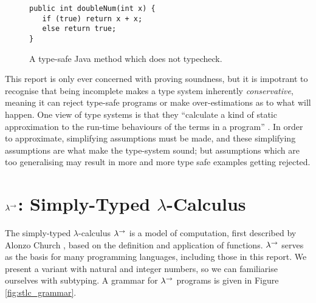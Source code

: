 \begin{figure}[h]
\vspace{-5pt}

\begin{lstlisting}
public int doubleNum(int x) {
   if (true) return x + x;
   else return true;
}
\end{lstlisting}
 
\vspace{-12pt}
\caption{A type-safe Java method which does not typecheck.}
\label{ref:java_typing_completeness}
\end{figure}

This report is only ever concerned with proving soundness, but it is impotrant to recognise that being incomplete makes a type system inherently \textit{conservative}, meaning it can reject type-safe programs or make over-estimations as to what will happen. One view of type systems is that they ``calculate a kind of static  approximation to the run-time behaviours of the terms in a program'' \cite[p. 2]{tapl}. In order to approximate, simplifying assumptions must be made, and these simplifying assumptions are what make the type-system sound; but assumptions which are too generalising may result in more and more type safe examples getting rejected.



\section{ $\lambda^{\rightarrow}$: Simply-Typed $\lambda$-Calculus}

The simply-typed $\lambda$-calculus $\lambda^{\rightarrow}$ is a model of computation, first described by Alonzo Church \cite{church40}, based on the definition and application of functions. $\lambda^{\rightarrow}$ serves as the basis for many programming languages, including those in this report. We present a variant with natural and integer numbers, so we can familiarise ourselves with subtyping. A grammar for $\lambda^{\rightarrow}$ programs is given in Figure \ref{fig:stlc_grammar}.

